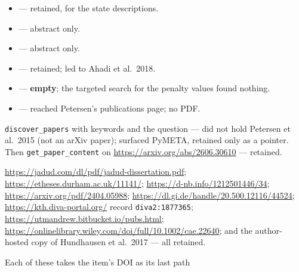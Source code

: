 \begin{description}
\begin{itemize}
{    compiler errors pdf brettbecker} --- no open copy.
  \item {} --- retained, for the state descriptions.
  \item {} --- abstract only.
  \item {} --- abstract
    only.
  \item {} --- retained;
    led to Ahadi et al.\ 2018.
  \item {} --- \textbf{empty}; the
    targeted search for the penalty values found nothing.
  \item {} --- reached Petersen's
    publications page; no PDF.
  \end{itemize}
\item[alphaXiv] \texttt{discover\_papers} with keywords  and the question
   --- did
  not hold Petersen et al.\ 2015 (not an arXiv paper); surfaced PyMETA,
  retained only as a pointer.  Then \texttt{get\_paper\_content} on
  \url{https://arxiv.org/abs/2606.30610} --- retained.
\item[WebFetch] \url{https://jadud.com/dl/pdf/jadud-dissertation.pdf};
  \url{https://etheses.durham.ac.uk/11141/};
  \url{https://d-nb.info/1212501446/34};
  \url{https://arxiv.org/pdf/2404.05988};
  \url{https://dl.gi.de/handle/20.500.12116/44524};
  \url{https://kth.diva-portal.org/} record \texttt{diva2:1877365};
  \url{https://utmandrew.bitbucket.io/pubs.html};
  \url{https://onlinelibrary.wiley.com/doi/full/10.1002/cae.22640}; and the
  author-hosted copy of Hundhausen et al.\ 2017 --- all retained.
\item[REST retrieval] Each of these takes the item's DOI as its last path

\end{description}

